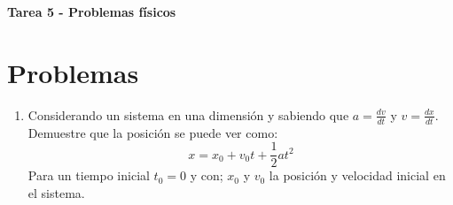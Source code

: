 \documentclass[letterpaper,12pt]{article}
\begin{document}
\begin{center}
    \textbf{\Large{Tarea 5 - Problemas físicos}}
\end{center}


\section{Problemas}
\begin{enumerate}
    \item Considerando un sistema en una dimensión y sabiendo que $a=\tfrac{dv}{dt}$ y $v=\tfrac{dx}{dt}$. Demuestre que la posición se puede ver como:
    \begin{equation}
        x =x_{0} + v_{0}t+ \frac{1}{2}at^2
    \end{equation}
    Para un tiempo inicial $t_0 = 0$ y con; $x_0$ y $v_0$ la posición y velocidad inicial en el sistema.

\end{enumerate}
\end{document}
